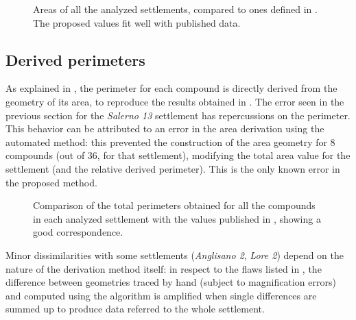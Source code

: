             \begin{figure}[H]
                \centering
                \begin{tikzpicture}
                    
                \end{tikzpicture}
                \caption[Areas of all the analyzed settlements compared with ones published in \cite{laterza}.]{Areas of all the analyzed settlements, compared to ones defined in \cite{laterza}. The proposed values fit well with published data.}
                \label{fig:graph-area}
            \end{figure}

        \subsection{Derived perimeters}
            
            As explained in , the perimeter for each compound is directly derived from the geometry of its area, to reproduce the results obtained in \cite{laterza}. The error seen in the previous section for the \emph{Salerno 13} settlement has repercussions on the perimeter. This behavior can be attributed to an error in the area derivation using the automated method: this prevented the construction of the area geometry for 8 compounds (out of 36, for that settlement), modifying the total area value for the settlement (and the relative derived perimeter). This is the only known error in the proposed method.

            \begin{figure}[H]
                \centering
                \begin{tikzpicture}
                    
                \end{tikzpicture}
                \caption[Comparison of published perimeters with ones obtained with the proposed method.]{Comparison of the total perimeters obtained for all the compounds in each analyzed settlement with the values published in \cite{laterza}, showing a good correspondence.}
                \label{fig:graph-perim}
            \end{figure}

            Minor dissimilarities with some settlements (\emph{Anglisano 2}, \emph{Lore 2}) depend on the nature of the derivation method itself: in respect to the flaws listed in , the difference between geometries traced by hand (subject to magnification errors) and computed using the algorithm is amplified when single differences are summed up to produce data referred to the whole settlement.

